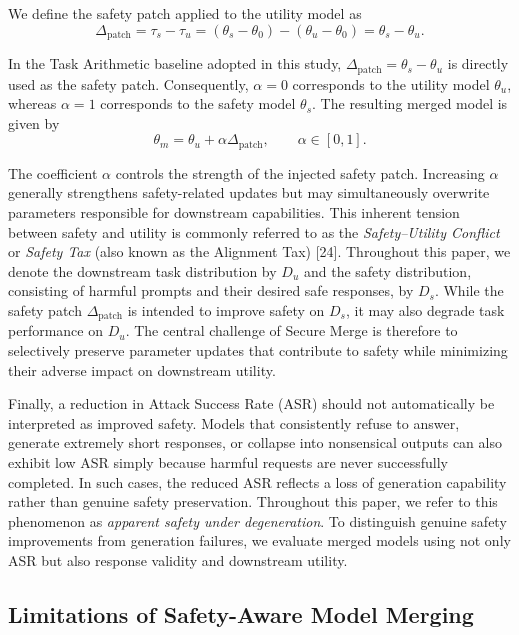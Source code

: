 \documentclass{article}
\begin{document}
We define the safety patch applied to the utility model as
\[
\Delta_{\mathrm{patch}}
=
\tau_s-\tau_u
=
(\theta_s-\theta_0)-(\theta_u-\theta_0)
=
\theta_s-\theta_u.
\]

In the Task Arithmetic baseline adopted in this study, $\Delta_{\mathrm{patch}}=\theta_s-\theta_u$ is directly used as the safety patch. Consequently, $\alpha=0$ corresponds to the utility model $\theta_u$, whereas $\alpha=1$ corresponds to the safety model $\theta_s$. The resulting merged model is given by
\[
\theta_m
=
\theta_u+\alpha\Delta_{\mathrm{patch}},
\qquad
\alpha\in[0,1].
\]

The coefficient $\alpha$ controls the strength of the injected safety patch. Increasing $\alpha$ generally strengthens safety-related updates but may simultaneously overwrite parameters responsible for downstream capabilities. This inherent tension between safety and utility is commonly referred to as the \emph{Safety--Utility Conflict} or \emph{Safety Tax} (also known as the Alignment Tax) [24]. Throughout this paper, we denote the downstream task distribution by $D_u$ and the safety distribution, consisting of harmful prompts and their desired safe responses, by $D_s$. While the safety patch $\Delta_{\mathrm{patch}}$ is intended to improve safety on $D_s$, it may also degrade task performance on $D_u$. The central challenge of Secure Merge is therefore to selectively preserve parameter updates that contribute to safety while minimizing their adverse impact on downstream utility.

Finally, a reduction in Attack Success Rate (ASR) should not automatically be interpreted as improved safety. Models that consistently refuse to answer, generate extremely short responses, or collapse into nonsensical outputs can also exhibit low ASR simply because harmful requests are never successfully completed. In such cases, the reduced ASR reflects a loss of generation capability rather than genuine safety preservation. Throughout this paper, we refer to this phenomenon as \emph{apparent safety under degeneration}. To distinguish genuine safety improvements from generation failures, we evaluate merged models using not only ASR but also response validity and downstream utility.

\subsection{Limitations of Safety-Aware Model Merging}
\end{document}

